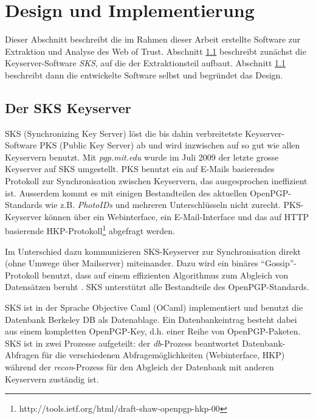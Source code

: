 \section{Design und Implementierung}
\label{ch:Grundlagen:sec:Design}

Dieser Abschnitt beschreibt die im Rahmen dieser Arbeit erstellte
Software zur Extraktion und Analyse des Web of Trust. Abschnitt
\ref{ch:Grundlagen:sec:Design:subsec:der-sks-keyserver} beschreibt
zunächst die Keyserver-Software \emph{SKS}, auf die %
der Extraktionsteil aufbaut. Abschnitt
\ref{ch:Grundlagen:sec:Design:subsec:der-sks-keyserver} beschreibt
dann die entwickelte Software selbst und begründet das Design.

\subsection{Der SKS Keyserver}
\label{ch:Grundlagen:sec:Design:subsec:der-sks-keyserver}

SKS (Synchronizing Key Server) löst die bis dahin verbreitetste
Keyserver-Software PKS (Public Key Server) ab und wird inzwischen auf
so gut wie allen Keyservern benutzt. Mit \emph{pgp.mit.edu} wurde im
Juli 2009 der letzte grosse Keyserver auf SKS umgestellt. PKS benutzt
ein auf E-Mails basierendes Protokoll zur Synchronisation zwischen
Keyservern, das ausgesprochen ineffizient ist. Ausserdem kommt es mit
einigen Bestandteilen des aktuellen OpenPGP-Standards wie
z.B. \emph{PhotoIDs} und mehreren Unterschlüsseln nicht
zurecht. PKS-Keyserver können über ein Webinterface, ein
E-Mail-Interface und das auf HTTP basierende
HKP-Protokoll\footnote{http://tools.ietf.org/html/draft-shaw-openpgp-hkp-00}
abgefragt werden.

Im Unterschied dazu kommunizieren SKS-Keyserver zur Synchronisation
direkt (ohne Umwege über Mailserver) miteinander.  Dazu wird ein
binäres "`Gossip"'-Protokoll benutzt, dass auf einem effizienten
Algorithmus zum Abgleich von Datensätzen beruht
\cite{Minsky2003}. SKS unterstützt alle Bestandteile des
OpenPGP-Standards.

SKS ist in der Sprache Objective Caml (OCaml) implementiert und
benutzt die Datenbank Berkeley DB als Datenablage. Ein
Datenbankeintrag besteht dabei aus einem kompletten OpenPGP-Key,
d.h. einer Reihe von OpenPGP-Paketen. SKS ist in zwei Prozesse
aufgeteilt: der \emph{db}-Prozess beantwortet Datenbank-Abfragen für
die verschiedenen Abfragemöglichkeiten (Webinterface, HKP) während der
\emph{recon}-Prozess für den Abgleich der Datenbank mit anderen
Keyservern zuständig ist.

